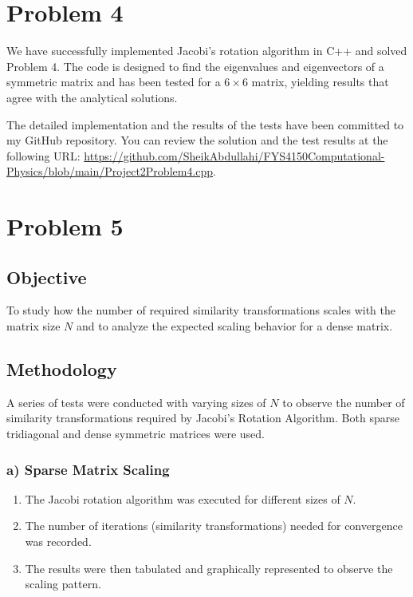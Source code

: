 \documentclass{article}
\begin{document}
\section*{Problem 4}

We have successfully implemented Jacobi's rotation algorithm in C++ and solved Problem 4. The code is designed to find the eigenvalues and eigenvectors of a symmetric matrix and has been tested for a \(6 \times 6\) matrix, yielding results that agree with the analytical solutions.

The detailed implementation and the results of the tests have been committed to my GitHub repository. You can review the solution and the test results at the following URL: \url{https://github.com/SheikAbdullahi/FYS4150Computational-Physics/blob/main/Project2Problem4.cpp}.

\section*{Problem 5}


\subsection*{Objective}
To study how the number of required similarity transformations scales with the matrix size \( N \) and to analyze the expected scaling behavior for a dense matrix.

\subsection*{Methodology}
A series of tests were conducted with varying sizes of \( N \) to observe the number of similarity transformations required by Jacobi's Rotation Algorithm. Both sparse tridiagonal and dense symmetric matrices were used.

\subsubsection*{a) Sparse Matrix Scaling}
\begin{enumerate}
    \item The Jacobi rotation algorithm was executed for different sizes of \( N \).
    \item The number of iterations (similarity transformations) needed for convergence was recorded.
    \item The results were then tabulated and graphically represented to observe the scaling pattern.
\end{enumerate}
\end{document}
